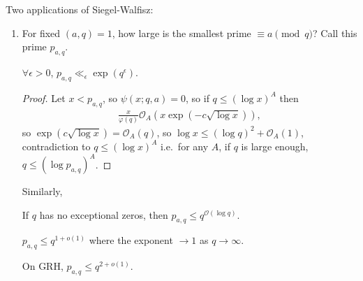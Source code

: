 \documentclass{article}
\newcommand{\1}{\mathbbm{1}}
\newcommand{\bigO}{\mathcal{O}}
\begin{document}
Two applications of Siegel-Walfisz:
\begin{enumerate}
  \item For fixed $(a,q) = 1$, how large is the smallest prime $\equiv a \pmod{q}$?
    Call this prime $p_{a,q}$.
    \begin{cor}
      $\forall \epsilon > 0$, $p_{a,q} \ll_\epsilon \exp(q^\epsilon)$.
    \end{cor}
    \begin{proof}
      Let $x < p_{a,q}$, so $\psi(x;q,a) = 0$, so if $q \leq (\log x)^A$ then
      \begin{align*}
        \frac{x}{\varphi(q)} \bigO_A(x \exp(-c \sqrt{\log x} )),
      \end{align*}
      so $\exp(c \sqrt{\log x}) = \bigO_A(q)$, so $\log x \leq (\log q)^2 + \bigO_A(1)$, contradiction to $q \leq (\log x)^A$ i.e.\ for any $A$, if $q$ is large enough, $q \leq (\log p_{a,q})^A$.
    \end{proof}

    Similarly,
    \begin{cor}
      If $q$ has no exceptional zeros, then $p_{a,q} \leq q^{\bigO(\log q)}$.
    \end{cor}
    \begin{conjecture}
      $p_{a,q} \leq q^{1 + o(1)}$
      where the exponent $\to 1$ as $q \to \infty$.
    \end{conjecture}
    On GRH, $p_{a,q} \leq q^{2 + o(1)}$.


\end{enumerate}
\end{document}
